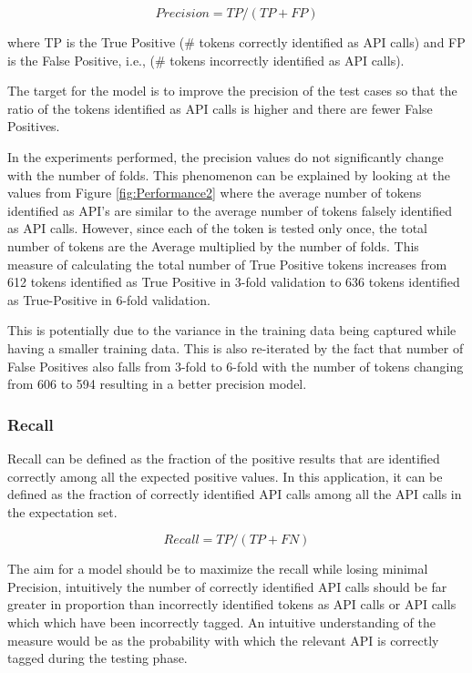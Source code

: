 \documentclass{sig-alternate-05-2015}
\begin{document}
\begin{equation}
Precision = TP/(TP+FP)
\end{equation}

where TP is the True Positive (\# tokens correctly identified as API calls) and FP is the False Positive, i.e., (\# tokens incorrectly identified as API calls).

The target for the model is to improve the precision of the test cases so that the ratio of the tokens identified as API calls is higher and there are fewer False Positives.

In the experiments performed, the precision values do not significantly change with the number of folds. This phenomenon can be explained by looking at the values from Figure \ref{fig:Performance2} where the average number of tokens identified as API's are similar to the average number of tokens falsely identified as API calls. However, since each of the token is tested only once, the total number of tokens are the Average multiplied by the number of folds. This measure of calculating the total number of True Positive tokens increases from 612 tokens identified as True Positive in 3-fold validation to 636 tokens identified as True-Positive in 6-fold validation. 

This is potentially due to the variance in the training data being captured while having a smaller training data. This is also re-iterated by the fact that number of False Positives also falls from 3-fold to 6-fold with the number of tokens changing from 606 to 594 resulting in a better precision model.

\subsubsection{Recall}
Recall can be defined as the fraction of the positive results that are identified correctly among all the expected positive values. In this application, it can be defined as the fraction of correctly identified API calls among all the API calls in the expectation set.

\begin{equation}
Recall = TP/(TP+FN)
\end{equation}

The aim for a model should be to maximize the recall while losing minimal Precision, intuitively the number of correctly identified API calls should be far greater in proportion than incorrectly identified tokens as API calls or API calls which which have been incorrectly tagged. An intuitive understanding of the measure would be as the probability with which the relevant API is correctly tagged during the testing phase.
\end{document}

